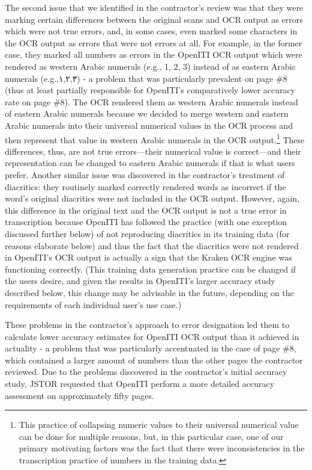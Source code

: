 The second issue that we identified in the contractor’s review was that they
were marking certain differences between the original scans and OCR output as
errors which were not true errors, and, in some cases, even marked some
characters in the OCR output as errors that were not errors at all. For
example, in the former case, they marked all numbers as errors in the OpenITI
OCR output which were rendered as western Arabic numerals (e.g., 1, 2, 3)
instead of as eastern Arabic numerals (e.g.,\textarabic{١,٢,٣}) - a problem
that was particularly prevalent on page \#8 (thus at least partially
responsible for OpenITI’s comparatively lower accuracy rate on page \#8). The
OCR rendered them as western Arabic numerals instead of eastern Arabic numerals
because we decided to merge western and eastern Arabic numerals into their
universal numerical values in the OCR process and then represent that value in
western Arabic numerals in the OCR output.\footnote{This practice of collapsing
numeric values to their universal numerical value can be done for multiple
reasons, but, in this particular case, one of our primary motivating factors
was the fact that there were inconsistencies in the transcription practice of
numbers in the training data.} These differences, thus, are not true
errors—their numerical value is correct—and their representation can be changed
to eastern Arabic numerals if that is what users prefer. Another similar issue
was discovered in the contractor’s treatment of diacritics: they routinely
marked correctly rendered words as incorrect if the word’s original diacritics
were not included in the OCR output. However, again, this difference in the
original text and the OCR output is not a true error in transcription because
OpenITI has followed the practice (with one exception discussed further below)
of not reproducing diacritics in its training data (for reasons elaborate
below) and thus the fact that the diacritics were not rendered in OpenITI’s OCR
output is actually a sign that the Kraken OCR engine was functioning correctly.
(This training data generation practice can be changed if the users desire, and
given the results in OpenITI’s larger accuracy study described below, this
change may be advisable in the future, depending on the requirements of each
individual user’s use case.)

These problems in the contractor’s approach to error designation led them to
calculate lower accuracy estimates for OpenITI OCR output than it achieved in
actuality - a problem that was particularly accentuated in the case of page \#8,
which contained a larger amount of numbers than the other pages the contractor
reviewed. Due to the problems discovered in the contractor’s initial accuracy
study, JSTOR requested that OpenITI perform a more detailed accuracy assessment
on approximately fifty pages. 

